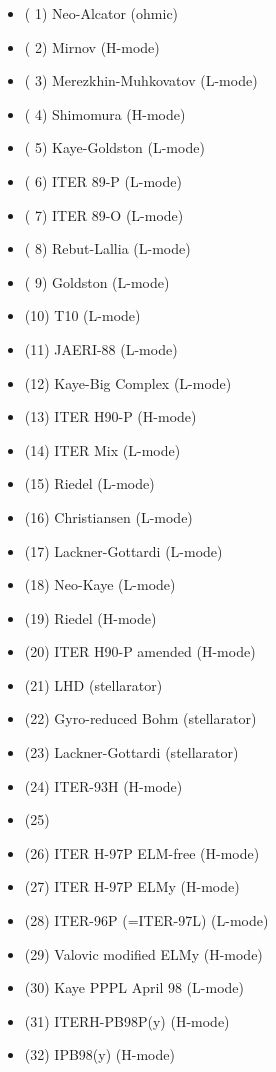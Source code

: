 \documentclass[]{article}
\begin{document}
\begin{itemize}
  \begin{itemize}
  \itemsep1pt\parskip0pt
  \item
    ( 1) Neo-Alcator (ohmic)
  \item
    ( 2) Mirnov (H-mode)
  \item
    ( 3) Merezkhin-Muhkovatov (L-mode)
  \item
    ( 4) Shimomura (H-mode)
  \item
    ( 5) Kaye-Goldston (L-mode)
  \item
    ( 6) ITER 89-P (L-mode)
  \item
    ( 7) ITER 89-O (L-mode)
  \item
    ( 8) Rebut-Lallia (L-mode)
  \item
    ( 9) Goldston (L-mode)
  \item
    (10) T10 (L-mode)
  \item
    (11) JAERI-88 (L-mode)
  \item
    (12) Kaye-Big Complex (L-mode)
  \item
    (13) ITER H90-P (H-mode)
  \item
    (14) ITER Mix (L-mode)
  \item
    (15) Riedel (L-mode)
  \item
    (16) Christiansen (L-mode)
  \item
    (17) Lackner-Gottardi (L-mode)
  \item
    (18) Neo-Kaye (L-mode)
  \item
    (19) Riedel (H-mode)
  \item
    (20) ITER H90-P amended (H-mode)
  \item
    (21) LHD (stellarator)
  \item
    (22) Gyro-reduced Bohm (stellarator)
  \item
    (23) Lackner-Gottardi (stellarator)
  \item
    (24) ITER-93H (H-mode)
  \item
    (25)
  \item
    (26) ITER H-97P ELM-free (H-mode)
  \item
    (27) ITER H-97P ELMy (H-mode)
  \item
    (28) ITER-96P (=ITER-97L) (L-mode)
  \item
    (29) Valovic modified ELMy (H-mode)
  \item
    (30) Kaye PPPL April 98 (L-mode)
  \item
    (31) ITERH-PB98P(y) (H-mode)
  \item
    (32) IPB98(y) (H-mode)

\end{itemize}
\end{itemize}
\end{document}
